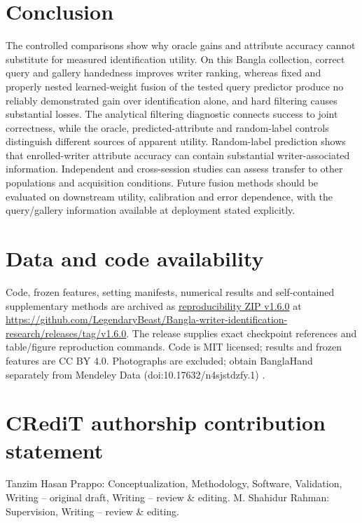 \documentclass[5p,times,twocolumn,final,numbers,sort&compress]{elsarticle}
\begin{document}
\section{Conclusion}
The controlled comparisons show why oracle gains and attribute accuracy cannot substitute for measured identification utility. On this Bangla collection, correct query and gallery handedness improves writer ranking, whereas fixed and properly nested learned-weight fusion of the tested query predictor produce no reliably demonstrated gain over identification alone, and hard filtering causes substantial losses. The analytical filtering diagnostic connects success to joint correctness, while the oracle, predicted-attribute and random-label controls distinguish different sources of apparent utility. Random-label prediction shows that enrolled-writer attribute accuracy can contain substantial writer-associated information. Independent and cross-session studies can assess transfer to other populations and acquisition conditions. Future fusion methods should be evaluated on downstream utility, calibration and error dependence, with the query/gallery information available at deployment stated explicitly.

\section*{Data and code availability}
Code, frozen features, setting manifests, numerical results and self-contained supplementary methods are archived as \href{https://github.com/LegendaryBeast/Bangla-writer-identification-research/releases/download/v1.6.0/wid-reproducibility-v1.6.0.zip}{reproducibility ZIP v1.6.0} at \url{https://github.com/LegendaryBeast/Bangla-writer-identification-research/releases/tag/v1.6.0}. The release supplies exact checkpoint references and table/figure reproduction commands. Code is MIT licensed; results and frozen features are CC BY 4.0. Photographs are excluded; obtain BanglaHand separately from Mendeley Data (doi:10.17632/n4sjstdzfy.1) \cite{banglahand2026data}.

\par\vspace{8pt}
\noindent\begin{minipage}{\columnwidth}
\section*{CRediT authorship contribution statement}
Tanzim Hasan Prappo: Conceptualization, Methodology, Software, Validation, Writing -- original draft, Writing -- review \& editing. M. Shahidur Rahman: Supervision, Writing -- review \& editing.
\par
\end{minipage}
\end{document}
